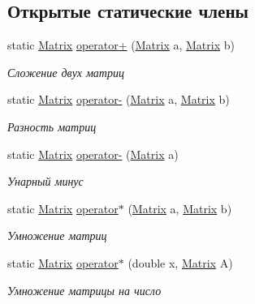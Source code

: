 \subsection*{Открытые статические члены}
\begin{DoxyCompactItemize}
\item 
static \hyperlink{class_b_l_a_s_1_1_matrix}{Matrix} \hyperlink{class_b_l_a_s_1_1_matrix_a4f01e6bba79f85ffffc92b7309b5d323}{operator+} (\hyperlink{class_b_l_a_s_1_1_matrix}{Matrix} a, \hyperlink{class_b_l_a_s_1_1_matrix}{Matrix} b)
\begin{DoxyCompactList}\small\item\em Сложение двух матриц \end{DoxyCompactList}\item 
static \hyperlink{class_b_l_a_s_1_1_matrix}{Matrix} \hyperlink{class_b_l_a_s_1_1_matrix_ae4f1195fb82b55af477919632adee368}{operator-\/} (\hyperlink{class_b_l_a_s_1_1_matrix}{Matrix} a, \hyperlink{class_b_l_a_s_1_1_matrix}{Matrix} b)
\begin{DoxyCompactList}\small\item\em Разность матриц \end{DoxyCompactList}\item 
static \hyperlink{class_b_l_a_s_1_1_matrix}{Matrix} \hyperlink{class_b_l_a_s_1_1_matrix_a4ec498275d375f747ed8e2d401416dc6}{operator-\/} (\hyperlink{class_b_l_a_s_1_1_matrix}{Matrix} a)
\begin{DoxyCompactList}\small\item\em Унарный минус \end{DoxyCompactList}\item 
static \hyperlink{class_b_l_a_s_1_1_matrix}{Matrix} \hyperlink{class_b_l_a_s_1_1_matrix_a2022997b0574ca2ff3a8df17a16562b8}{operator$\ast$} (\hyperlink{class_b_l_a_s_1_1_matrix}{Matrix} a, \hyperlink{class_b_l_a_s_1_1_matrix}{Matrix} b)
\begin{DoxyCompactList}\small\item\em Умножение матриц \end{DoxyCompactList}\item 
static \hyperlink{class_b_l_a_s_1_1_matrix}{Matrix} \hyperlink{class_b_l_a_s_1_1_matrix_ae8042451c61299687cfb3fbd7a33493e}{operator$\ast$} (double x, \hyperlink{class_b_l_a_s_1_1_matrix}{Matrix} A)
\begin{DoxyCompactList}\small\item\em Умножение матрицы на число \end{DoxyCompactList}\end{DoxyCompactItemize}
